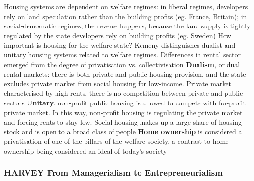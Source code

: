 \documentclass{article}
\begin{document}
\begin{outline}
		\2 Housing systems are dependent on welfare regimes: in liberal regimes, developers rely on land speculation rather than the building profits (eg. France, Britain); in social-democratic regimes, the reverse happens, because the land supply is tightly regulated by the state developers rely on building profits (eg. Sweden)
		\2 How important is housing for the welfare state?	Kemeny distinguishes dualist and unitary housing systems related to welfare regimes. Differences in rental sector emerged from the degree of privatisation vs. collectivisation
		\2 \textbf{Dualism}, or dual rental markets: there is both private and public housing provision, and the state excludes private market from social housing for low-income. Private market characterised by high rents, there is no competition between private and public sectors
		\2 \textbf{Unitary}: non-profit public housing is allowed to compete with for-profit private market. In this way, non-profit housing is regulating the private market and forcing rents to stay low. Social housing makes up a large share of housing stock and is open to a broad class of people
	\1 \textbf{Home ownership} is considered a privatisation of one of the pillars of the welfare society, a contrast to home ownership being considered an ideal of today's society
\end{outline}

\subsubsection{HARVEY From Managerialism to Entrepreneurialism}
\end{document}
